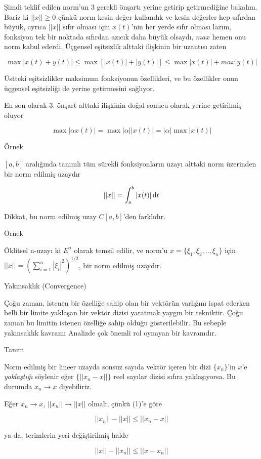 \documentclass[12pt,fleqn]{article}\usepackage{../../common}
\begin{document}
Şimdi teklif edilen norm'un 3 gerekli önşartı yerine getirip getirmediğine
bakalım. Bariz ki $||x|| \ge 0$ çünkü norm kesin değer kullandık ve kesin
değerler hep sıfırdan büyük, ayrıca $||x||$ sıfır olması için $x(t)$'nin
her yerde sıfır olması lazım, fonksiyon tek bir noktada sıfırdan azıcık
daha büyük olsaydı, $max$ hemen onu norm kabul ederdi. Üçgensel eşitsizlik
alttaki ilişkinin bir uzantısı zaten

$$ 
\max |x(t) + y(t)| \le 
\max [|x(t)| + |y(t)|] \le
\max |x(t)| + max |y(t)|
$$

Üstteki eşitsizlikler maksimum fonksiyonun özellikleri, ve bu özellikler
onun üçgensel eşitsizliği de yerine getirmesini sağlıyor. 

En son olarak 3. önşart alttaki ilişkinin doğal sonucu olarak yerine
getirilmiş oluyor 

$$ \max |\alpha x(t)|  = \max |\alpha||x(t)| = |\alpha| \max |x(t)|  $$

Örnek

$[a,b]$ aralığında tanımlı tüm sürekli fonksiyonların uzayı alttaki norm
üzerinden bir norm edilmiş uzaydır

$$ ||x|| = \int_{ a}^{b} |x(t)| \,\mathrm{d} t $$

Dikkat, bu norm edilmiş uzay $C[a,b]$'den farklıdır. 

Örnek 

Öklitsel n-uzayı ki $E^n$ olarak temsil edilir, ve norm'u $x = \{ \xi_1,
\xi_2, .., \xi_n\}$ için $||x|| = (\sum_{ i=1}^{n} |\xi_i|^2)^{1/2}$, bir
norm edilmiş uzaydır.

Yakınsaklık (Convergence)

Çoğu zaman, istenen bir özelliğe sahip olan bir vektörün varlığını ispat ederken
belli bir limite yaklaşan bir vektör dizisi yaratmak yaygın bir tekniktir. Çoğu
zaman bu limitin istenen özelliğe sahip olduğu gösterilebilir. Bu sebeple
yakınsaklık kavramı Analizde çok önemli rol oynayan bir kavramdır.

Tanım 

Norm edilmiş bir lineer uzayda sonsuz sayıda vektör içeren bir dizi
$\{x_n\}$'in $x$'e {\em yaklaştığı} söylenir eğer $\{||x_n-x||\}$ reel
sayılar dizisi sıfıra yaklaşıyorsa. Bu durumda $x_n \to x$ diyebiliriz.

Eğer $x_n \to x$, $||x_n|| \to ||x||$ olmalı, çünkü (1)'e göre 

$$ ||x_n||  - ||x|| \le ||x_n-x|| $$

ya da, terimlerin yeri değiştirilmiş halde

$$ ||x||  - ||x_n|| \le ||x-x_n|| $$
\end{document}
